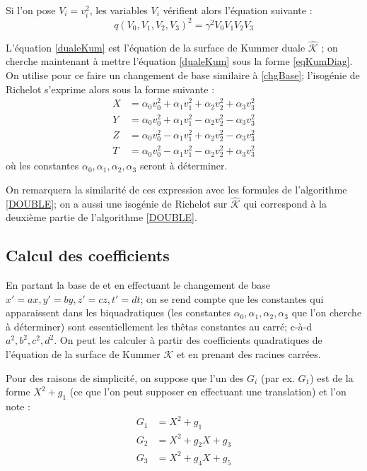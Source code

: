 \documentclass[a4paper]{article}
\theoremstyle{definition}
\theoremstyle{remark}
\numberwithin{equation}{section}
\begin{document}
Si l'on pose $V_i = v_i^2$, les variables $V_i$ vérifient alors l'équation suivante :
\begin{equation}
\label{dualeKum}
q(V_0,V_1,V_2,V_3)^2 = \gamma^2 V_0V_1V_2V_3
\end{equation}

L'équation \ref{dualeKum} est l'équation de la surface de Kummer duale $\hat{\mathcal{K}}$ \citep{cassels-Flynn}; on cherche maintenant à mettre l'équation \ref{dualeKum} sous la forme \ref{eqKumDiag}. On utilise pour ce faire un changement de base similaire à \ref{chgBase}; l'isogénie de Richelot s'exprime alors sous la forme suivante :
\begin{align*}
X &= \alpha_0v_0^2+\alpha_1v_1^2+\alpha_2v_2^2+\alpha_3v_3^2 \\
Y &= \alpha_0v_0^2+\alpha_1v_1^2-\alpha_2v_2^2-\alpha_3v_3^2 \\
Z &= \alpha_0v_0^2-\alpha_1v_1^2+\alpha_2v_2^2-\alpha_3v_3^2 \\
T &= \alpha_0v_0^2-\alpha_1v_1^2-\alpha_2v_2^2+\alpha_3v_3^2
\end{align*}
où les constantes $\alpha_0,\alpha_1,\alpha_2,\alpha_3$ seront à déterminer.

On remarquera la similarité de ces expression avec les formules de l'algorithme \ref{DOUBLE}; on a aussi une isogénie de Richelot sur $\hat{\mathcal{K}}$ qui correspond à la deuxième partie de l'algorithme \ref{DOUBLE}.

\subsection{Calcul des coefficients}

En partant la base de \citet{gaudry} et en effectuant le changement de base $x'=ax,y'=by,z'=cz,t'=dt$; on se rend compte que les constantes qui apparaissent dans les biquadratiques (les constantes $\alpha_0,\alpha_1,\alpha_2,\alpha_3$ que l'on cherche à déterminer) sont essentiellement les thêtas constantes au carré; c-à-d $a^2,b^2,c^2,d^2$. On peut les calculer à partir des coefficients quadratiques de l'équation de la surface de Kummer $\mathcal{K}$ et en prenant des racines carrées.

Pour des raisons de simplicité, on suppose que l'un des $G_i$ (par ex. $G_1$) est de la forme $X^2 + g_1$ (ce que l'on peut supposer en effectuant une translation) et l'on note :
\begin{align*}
G_1 &= X^2 + g_1 \\
G_2 &= X^2+g_2X+g_3 \\
G_3 &= X^2+g_4X+g_5
\end{align*}
\end{document}
